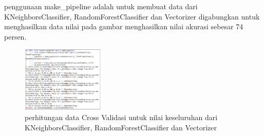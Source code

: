 \begin{enumerate}
        \subitem penggunaan make\_pipeline adalah untuk membuat data dari KNeighborsClassifier, RandomForestClassifier dan Vectorizer digabungkan untuk menghasilkan data nilai pada gambar menghasilkan nilai akurasi sebesar 74 persen. 
        \begin{figure}[H]
            \includegraphics[width=4cm]{figures/1174026/5/34.png}
            \centering
            \caption{perhitungan data Cross Validasi untuk nilai keseluruhan dari KNeighborsClassifier, RandomForestClassifier dan Vectorizer}
        \end{figure}
        
        \end{enumerate}